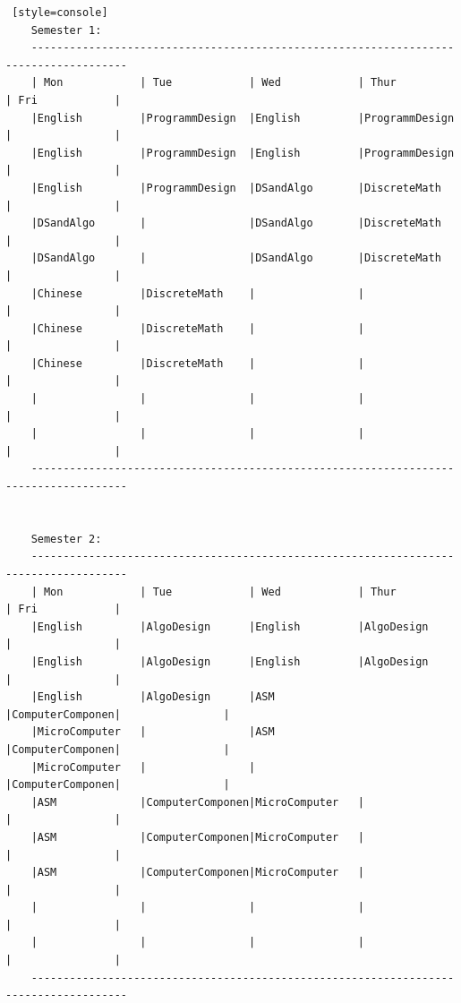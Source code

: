 \begin{lstlisting} [style=console]
    Semester 1: 
    -------------------------------------------------------------------------------------
    | Mon            | Tue            | Wed            | Thur           | Fri            |
    |English         |ProgrammDesign  |English         |ProgrammDesign  |                |
    |English         |ProgrammDesign  |English         |ProgrammDesign  |                |
    |English         |ProgrammDesign  |DSandAlgo       |DiscreteMath    |                |
    |DSandAlgo       |                |DSandAlgo       |DiscreteMath    |                |
    |DSandAlgo       |                |DSandAlgo       |DiscreteMath    |                |
    |Chinese         |DiscreteMath    |                |                |                |
    |Chinese         |DiscreteMath    |                |                |                |
    |Chinese         |DiscreteMath    |                |                |                |
    |                |                |                |                |                |
    |                |                |                |                |                |
    -------------------------------------------------------------------------------------
    
    
    Semester 2: 
    -------------------------------------------------------------------------------------
    | Mon            | Tue            | Wed            | Thur           | Fri            |
    |English         |AlgoDesign      |English         |AlgoDesign      |                |
    |English         |AlgoDesign      |English         |AlgoDesign      |                |
    |English         |AlgoDesign      |ASM             |ComputerComponen|                |
    |MicroComputer   |                |ASM             |ComputerComponen|                |
    |MicroComputer   |                |                |ComputerComponen|                |
    |ASM             |ComputerComponen|MicroComputer   |                |                |
    |ASM             |ComputerComponen|MicroComputer   |                |                |
    |ASM             |ComputerComponen|MicroComputer   |                |                |
    |                |                |                |                |                |
    |                |                |                |                |                |
    -------------------------------------------------------------------------------------
    

\end{lstlisting}
